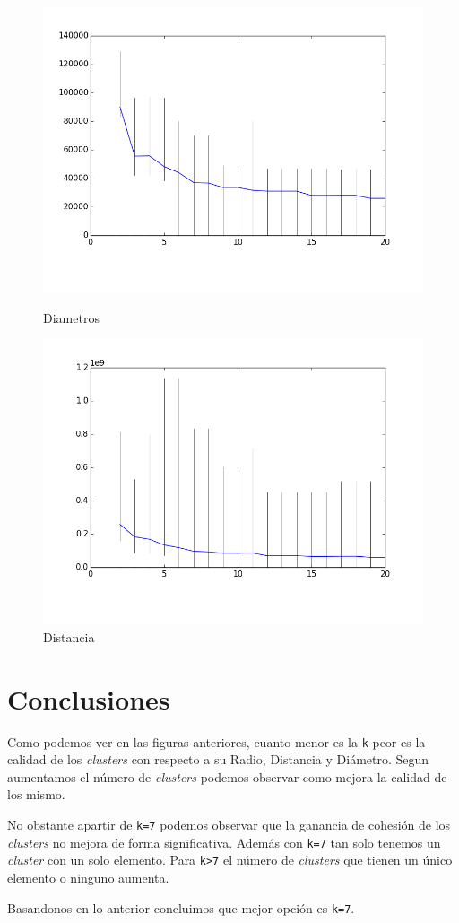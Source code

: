 \documentclass{article}
\begin{document}
    \begin{figure}
      \centering
      \includegraphics[keepaspectratio, width=1\textwidth]{../imgs/Diametros.png}
      \caption{Diametros}
      \label{fig:diam}
      \includegraphics[keepaspectratio, width=1\textwidth]{../imgs/Distancia.png}
      \caption{Distancia}
      \label{fig:dist}
    \end{figure}

  \section{Conclusiones}
    Como podemos ver en las figuras anteriores, cuanto menor es la \texttt{k} 
    peor es la calidad de los \emph{clusters} con respecto a su Radio, Distancia y 
    Diámetro. Segun aumentamos el número de \emph{clusters} podemos observar como
    mejora la calidad de los mismo.
    \par
    No obstante apartir de \texttt{k=7} podemos observar que la ganancia de cohesión
    de los \emph{clusters} no mejora de forma significativa. Además con \texttt{k=7}
    tan solo tenemos un \emph{cluster} con un solo elemento. Para \texttt{k>7} el
    número de \emph{clusters} que tienen un único elemento o ninguno aumenta.  
    \par
    Basandonos en lo anterior concluimos que mejor opción es \texttt{k=7}.  
    
\end{document}
